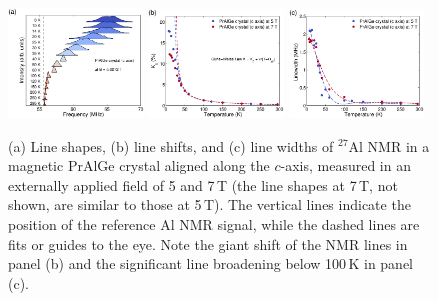 \documentclass[aps,prb,a4paper,10pt,twocolumn,showpacs,floatfix,superscriptaddress,preprintnumbers,longbibliography]{revtex4-2}
\begin{document}
%
\begin{figure}[!htb]
	\centering 
	\includegraphics[width=0.32\textwidth,angle=0]{figures/PrAlGe_c_axis_5T/PrAlGe_c_axis_lines_vs_temp}%
	\includegraphics[width=0.32\textwidth]{figures/PrAlGe_c_axis_5T/27AlS_vs_T}%
	\includegraphics[width=0.32\textwidth]{figures/PrAlGe_c_axis_5T/27Alwidth_vs_T}%
	\caption{\label{fig:PrAlGe_c_axis_5T}(a) Line shapes, (b) line shifts,  and (c) line widths of $^{27}$Al NMR in a magnetic PrAlGe crystal aligned along the $c$-axis, measured in an externally applied field of 5 and 7\,T (the line shapes at 7\,T, not shown, are similar to those at 5\,T). 
	The vertical lines indicate the position of the reference Al NMR signal, while the dashed lines are fits or guides to the eye. Note the giant shift of the NMR lines in panel (b) and the significant line broadening below 100\,K in panel (c).}
\end{figure}
%
\end{document}
